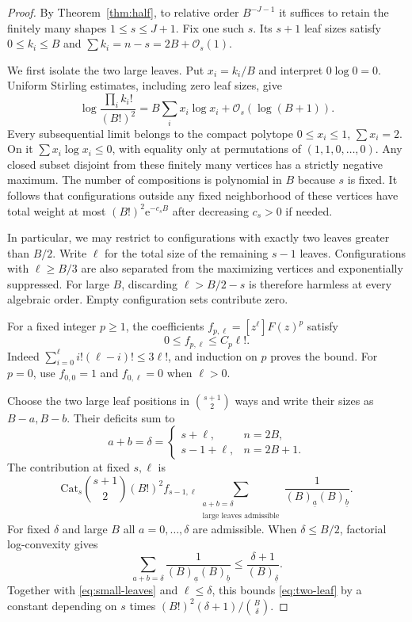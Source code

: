 \documentclass[11pt,letterpaper]{article}
\numberwithin{equation}{section}
\theoremstyle{remark}\newtheorem{remark}[theorem]{Remark}
\newcommand{\e}{\mathrm e}
\newcommand{\Ord}{\mathcal O}
\newcommand{\fall}[2]{(#1)_{\underline{#2}}}
\begin{document}
\begin{proof}
By Theorem~\ref{thm:half}, to relative order $B^{-J-1}$ it suffices to retain the finitely many shapes $1\le s\le J+1$. Fix one such $s$. Its $s+1$ leaf sizes satisfy $0\le k_i\le B$ and $\sum k_i=n-s=2B+\Ord_s(1)$.

We first isolate the two large leaves. Put $x_i=k_i/B$ and interpret $0\log0=0$. Uniform Stirling estimates, including zero leaf sizes, give
\begin{equation}\label{eq:entropy}
 \log\frac{\prod_i k_i!}{(B!)^2}
       =B\sum_i x_i\log x_i+\Ord_s(\log(B+1)).
\end{equation}
Every subsequential limit belongs to the compact polytope
$0\le x_i\le1$, $\sum x_i=2$. On it $\sum x_i\log x_i\le0$, with equality only at permutations of $(1,1,0,\ldots,0)$. Any closed subset disjoint from these finitely many vertices has a strictly negative maximum. The number of compositions is polynomial in $B$ because $s$ is fixed. It follows that configurations outside any fixed neighborhood of these vertices have total weight at most $(B!)^2\e^{-c_sB}$ after decreasing $c_s>0$ if needed.

In particular, we may restrict to configurations with exactly two leaves greater than $B/2$. Write $\ell$ for the total size of the remaining $s-1$ leaves. Configurations with $\ell\ge B/3$ are also separated from the maximizing vertices and exponentially suppressed. For large $B$, discarding $\ell>B/2-s$ is therefore harmless at every algebraic order. Empty configuration sets contribute zero.

For a fixed integer $p\ge1$, the coefficients $f_{p,\ell}=[z^\ell]F(z)^p$ satisfy
\begin{equation}\label{eq:small-leaves}
 0\le f_{p,\ell}\le C_p\ell!.
\end{equation}
Indeed $\sum_{i=0}^{\ell}i!(\ell-i)!\le3\ell!$, and induction on $p$ proves the bound. For $p=0$, use $f_{0,0}=1$ and $f_{0,\ell}=0$ when $\ell>0$.

Choose the two large leaf positions in $\binom{s+1}{2}$ ways and write their sizes as $B-a,B-b$. Their deficits sum to
\[
 a+b=\delta=\begin{cases}s+\ell,&n=2B,\\s-1+\ell,&n=2B+1.\end{cases}
\]
The contribution at fixed $s,\ell$ is
\begin{equation}\label{eq:two-leaf}
 \mathrm{Cat}_s\binom{s+1}{2}(B!)^2 f_{s-1,\ell}
       \sum_{\substack{a+b=\delta\\\text{large leaves admissible}}}
           \frac1{\fall B a\fall B b}.
\end{equation}
For fixed $\delta$ and large $B$ all $a=0,\ldots,\delta$ are admissible. When $\delta\le B/2$, factorial log-convexity gives
\[
 \sum_{a+b=\delta}\frac1{\fall B a\fall B b}
 \le\frac{\delta+1}{\fall B\delta}.
\]
Together with \eqref{eq:small-leaves} and $\ell\le\delta$, this bounds \eqref{eq:two-leaf} by a constant depending on $s$ times
$(B!)^2(\delta+1)/\binom B\delta$.


\end{proof}
\end{document}
